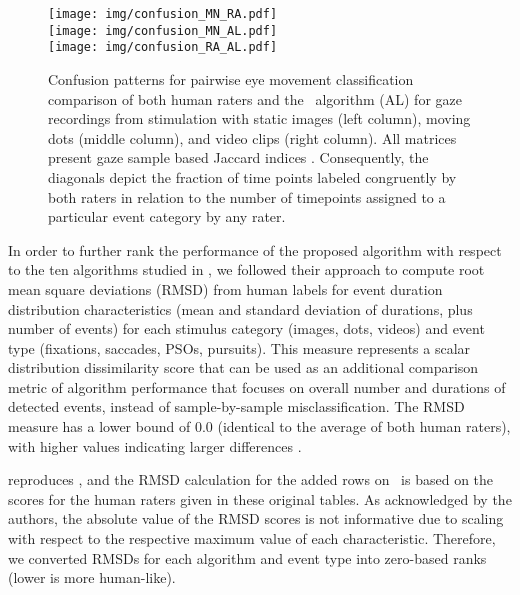 \begin{figure*}
  \texttt{[image: img/confusion\_MN\_RA.pdf]} \\
  \texttt{[image: img/confusion\_MN\_AL.pdf]} \\
  \texttt{[image: img/confusion\_RA\_AL.pdf]}

  \caption{Confusion patterns for pairwise eye movement classification
    comparison of both human raters \citep[MN and RA; ][]{Andersson2017} and the
    \remodnav\ algorithm (AL) for gaze recordings from stimulation with static
    images (left column), moving dots (middle column), and video clips (right
    column).  All matrices present gaze sample based Jaccard indices \citep[JI;
    ][]{jaccard1901etude}. Consequently, the diagonals depict the fraction of
    time points labeled congruently by both raters in relation to the number of
    timepoints assigned to a particular event category by any rater.}
  \label{fig:conf}
\end{figure*}


In order to further rank the performance of the proposed algorithm with respect
to the ten algorithms studied in \citet{Andersson2017}, we followed their
approach to compute root mean square deviations (RMSD) from human labels for
event duration distribution characteristics (mean and standard deviation of
durations, plus number of events) for each stimulus category (images, dots,
videos) and event type (fixations, saccades, PSOs, pursuits). This measure
represents a scalar distribution dissimilarity score that can be used as an
additional comparison metric of algorithm performance that focuses on overall
number and durations of detected events, instead of sample-by-sample
misclassification. The RMSD measure has a lower bound of $0.0$ (identical to
the average of both human raters), with higher values indicating larger
differences \citep[for detail information on the calculation of this metric
see][]{Andersson2017}.

 reproduces \citet[Tables
3-6]{Andersson2017}, and the RMSD calculation for the added rows on \remodnav\
is based on the scores for the human raters given in these original tables. As
acknowledged by the authors, the absolute value of the RMSD scores is not
informative due to scaling with respect to the respective maximum value of each
characteristic.  Therefore, we converted RMSDs for each algorithm and event
type into zero-based ranks (lower is more human-like).

